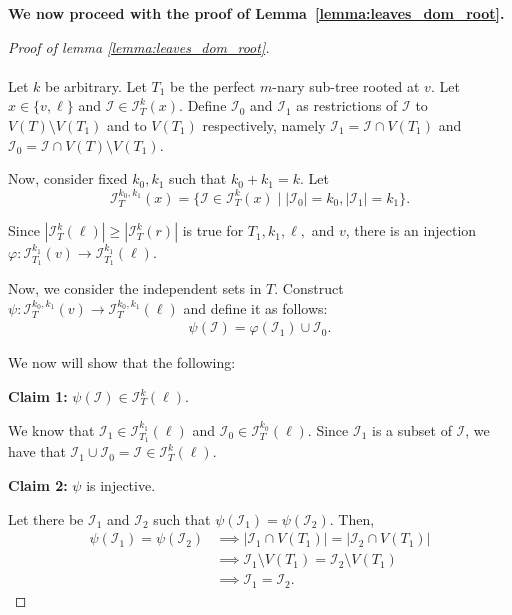 \documentclass[10pt]{amsart}
\theoremstyle{definition}
\begin{document}
\noindent \textbf{We now proceed with the proof of Lemma~\ref{lemma:leaves_dom_root}.}
\begin{proof}[Proof of lemma \ref{lemma:leaves_dom_root}]
	$ $
	\\ \\
	Let $k$ be arbitrary. Let $T_1$ be the perfect $m$-nary sub-tree rooted at $v$. Let $x \in \{v, \ell \}$ and $\mathcal{I} \in \mathcal{I}_T^{k}(x)$. Define $\mathcal{I}_0$ and $\mathcal{I}_1$ as restrictions of $\mathcal{I}$ to $V(T)\setminus V(T_1)$ and to $V(T_1)$ respectively, namely $\mathcal{I}_1 = \mathcal{I} \cap V(T_1)$ and $\mathcal{I}_0 = \mathcal{I} \cap V(T) \setminus V(T_1)$.

	Now, consider fixed $k_0, k_1$ such that $k_0 + k_1 = k$. Let $$\mathcal{I}_T^{k_0,k_1}(x)=\{\mathcal{I}\in \mathcal{I}^{k}_{T}(x) \;|\; |\mathcal{I}_0|=k_0, |\mathcal{I}_1|=k_1  \}.$$

	Since $|\mathcal{I}_T^k(\ell)| \geq |\mathcal{I}_T^k(r)|$ is true for $T_1, k_1, \ell,$ and $v$, there is an injection $\varphi : \mathcal{I}_{T_1}^{k_1}(v) \to \mathcal{I}_{T_1}^{k_1}(\ell)$.

	Now, we consider the independent sets in $T$. Construct $\psi : \mathcal{I}_T^{k_0,k_1}(v) \to \mathcal{I}_T^{k_0,k_1}(\ell)$ and define it as follows:
	\begin{align*}
		\psi(\mathcal{I}) = \varphi(\mathcal{I}_1) \cup \mathcal{I}_0.
	\end{align*}

	We now will show that the following:
	\vspace{0.5em}

	\noindent \textbf{Claim 1:} $\psi(\mathcal{I}) \in \mathcal{I}^k_T(\ell)$.

	We know that $\mathcal{I}_1 \in \mathcal{I}_{T_1}^{k_1}(\ell)$ and $\mathcal{I}_0 \in \mathcal{I}_{T}^{k_0}(\ell)$. Since $\mathcal{I}_1$ is a subset of $\mathcal{I}$, we have that $\mathcal{I}_1 \cup \mathcal{I}_0 = \mathcal{I} \in \mathcal{I}_T^k(\ell)$.
	\vspace{0.5em}

	\noindent \textbf{Claim 2:} $\psi$ is injective.

	Let there be $\mathcal{I}_1$ and $\mathcal{I}_2$ such that $\psi(\mathcal{I}_1) = \psi(\mathcal{I}_2)$. Then,
	\begin{align*}
		\psi(\mathcal{I}_1) = \psi(\mathcal{I}_2) & \implies |\mathcal{I}_1 \cap V(T_1)| = |\mathcal{I}_2 \cap V(T_1)|       \\
		                                          & \implies \mathcal{I}_1 \setminus V(T_1) = \mathcal{I}_2 \setminus V(T_1) \\
		                                          & \implies \mathcal{I}_1 = \mathcal{I}_2.
	\end{align*}


\end{proof}
\end{document}

